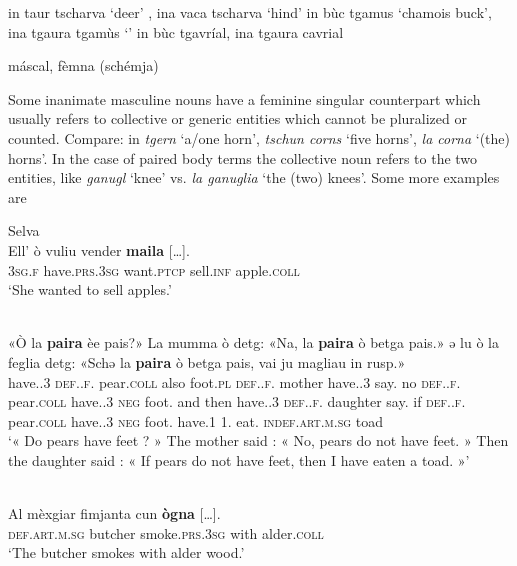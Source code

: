 in taur tscharva `deer' , ina vaca tscharva `hind'
in bùc tgamus `chamois buck', ina tgaura tgamùs `'
in bùc tgavríal, ina tgaura cavrial

máscal, fèmna (schémja)


Some inanimate masculine nouns have a feminine singular counterpart which usually refers to collective or generic entities which cannot be pluralized or counted. Compare: in \textit{tgern} ‘a/one horn’, \textit{tschun corns} ‘five horns’, \textit{la corna} ‘(the) horns’. In the case of paired body terms the collective noun refers to the two entities, like \textit{ganugl} ‘knee’ vs. \textit{la ganuglia} ‘the (two) knees’. Some more examples are


 \ea\label{}
 {Selva} {\citealt[26]{Büchli1966}}\\
\gll    Ell’ ò vuliu vender \textbf{maila} […].\\
    \textsc{3sg.f} have.\textsc{prs.3sg} want.\textsc{ptcp} sell.\textsc{inf} apple.\textsc{coll}\\
\glt `She wanted to sell apples.'
\z

\ea\label{ex:1:adj}
 {\citealt[53]{Büchli1966}}\\
\gll «Ò la \textbf{paira} èe pais?» La mumma ò detg: «Na, la \textbf{paira} ò betga pais.» ǝ lu ò la feglia detg: «Schǝ la \textbf{paira} ò betga pais, vai ju magliau in rusp.»\\
have.{\prs}.3{\sg} \textsc{def}.{\art}.\textsc{f}.{\sg} pear.\textsc{coll} also foot.\textsc{pl} \textsc{def}.{\art}.\textsc{f}.{\sg} mother have.{\prs}.3{\sg} say.{\ptcp} no \textsc{def}.{\art}.\textsc{f}.{\sg} pear.\textsc{coll} have.{\prs}.3{\sg} \textsc{neg} foot.{\pl} and then have.{\prs}.3{\sg} \textsc{def}.{\art}.\textsc{f}.{\sg} daughter say.{\ptcp} if \textsc{def}.{\art}.\textsc{f}.{\sg} pear.\textsc{coll} have.{\prs}.3{\sg} \textsc{neg} foot.{\pl} have.1{\sg} 1{\sg}. eat.{\ptcp} \textsc{indef}.\textsc{art}.\textsc{m}.\textsc{sg}  toad\\
\glt `« Do pears have feet ? » The mother said : « No, pears do not have feet. » Then the daughter said : « If pears do not have feet, then I have eaten a toad. »'
\z

\ea\label{}
\\
\gll  Al mèxgiar fimjanta cun \textbf{ògna} […].  \\
    \textsc{def.art.m.sg} butcher smoke.\textsc{prs.3sg} with alder.\textsc{coll} \\
\glt `The butcher smokes with alder wood.'
\z

